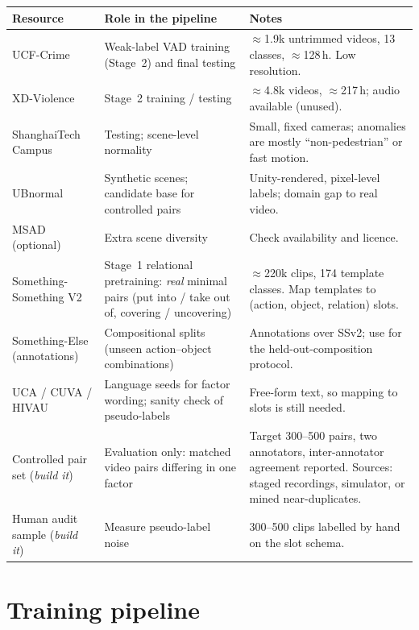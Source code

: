 \documentclass[11pt,a4paper]{article}
\begin{document}
\begin{tabularx}{\linewidth}{@{}l Y Y@{}}
\toprule
Resource & Role in the pipeline & Notes\\
\midrule
UCF-Crime & Weak-label VAD training (Stage~2) and final testing & $\approx$1.9k untrimmed videos, 13 classes, $\approx$128\,h. Low resolution.\\
XD-Violence & Stage~2 training / testing & $\approx$4.8k videos, $\approx$217\,h; audio available (unused).\\
ShanghaiTech Campus & Testing; scene-level normality & Small, fixed cameras; anomalies are mostly ``non-pedestrian'' or fast motion.\\
UBnormal & Synthetic scenes; candidate base for controlled pairs & Unity-rendered, pixel-level labels; domain gap to real video.\\
MSAD (optional) & Extra scene diversity & Check availability and licence.\\
Something-Something V2 & Stage~1 relational pretraining: \emph{real} minimal pairs (put into / take out of, covering / uncovering) & $\approx$220k clips, 174 template classes. Map templates to (action, object, relation) slots.\\
Something-Else (annotations) & Compositional splits (unseen action--object combinations) & Annotations over SSv2; use for the held-out-composition protocol.\\
UCA / CUVA / HIVAU & Language seeds for factor wording; sanity check of pseudo-labels & Free-form text, so mapping to slots is still needed.\\
Controlled pair set (\emph{build it}) & Evaluation only: matched video pairs differing in one factor & Target 300--500 pairs, two annotators, inter-annotator agreement reported. Sources: staged recordings, simulator, or mined near-duplicates.\\
Human audit sample (\emph{build it}) & Measure pseudo-label noise & 300--500 clips labelled by hand on the slot schema.\\
\bottomrule
\end{tabularx}

\section{Training pipeline}
\label{sec:pipeline}
\end{document}

